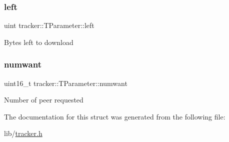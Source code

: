 \subsubsection{\texorpdfstring{left}{left}}
{\footnotesize\ttfamily uint tracker\+::\+T\+Parameter\+::left}

Bytes left to download \mbox{\label{structtracker_1_1TParameter_a21bb71f791e005b04f27d2d1ea1b7907}} 
\subsubsection{\texorpdfstring{numwant}{numwant}}
{\footnotesize\ttfamily uint16\+\_\+t tracker\+::\+T\+Parameter\+::numwant}

Number of peer requested 

The documentation for this struct was generated from the following file\+:\begin{DoxyCompactItemize}
\item 
lib/\hyperlink{tracker_8h}{tracker.\+h}\end{DoxyCompactItemize}

